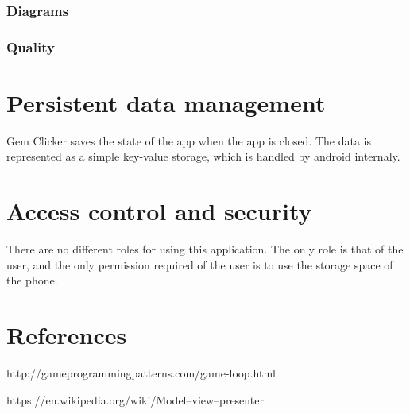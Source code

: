 \documentclass{article}
\begin{document}
\subsubsection{Diagrams}

\subsubsection{Quality}

\section{Persistent data management}
Gem Clicker saves the state of the app when the app is closed. 
The data is represented as a simple key-value storage, which is handled by android internaly.

\section{Access control and security}
There are no different roles for using this application. The only role is that of the user,
and the only permission required of the user is to use the storage space of the phone.

\section{References}
\begin{thebibliography}{9}
    
        http://gameprogrammingpatterns.com/game-loop.html
    
        https://en.wikipedia.org/wiki/Model–view–presenter

\end{thebibliography}
\end{document}
